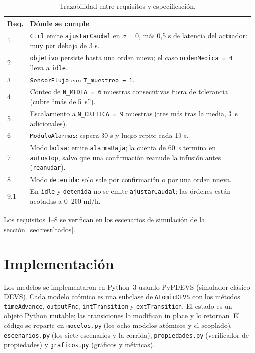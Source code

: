 \documentclass[11pt,a4paper]{article}
\begin{document}
\begin{table}[h]
\centering
\small
\renewcommand{\arraystretch}{1.15}
\begin{tabular}{>{\raggedright}p{1.2cm} p{12.5cm}}
\toprule
Req. & Dónde se cumple \\
\midrule
1 & \texttt{Ctrl} emite \texttt{ajustarCaudal} en $\sigma = 0$, más 0,5 s de latencia del actuador: muy por debajo de 3 s. \\
2 & \texttt{objetivo} persiste hasta una orden nueva; el caso \texttt{ordenMedica = 0} lleva a \texttt{idle}. \\
3 & \texttt{SensorFlujo} con \texttt{T\_muestreo = 1}. \\
4 & Conteo de \texttt{N\_MEDIA = 6} muestras consecutivas fuera de tolerancia (cubre ``más de 5~s''). \\
5 & Escalamiento a \texttt{N\_CRITICA = 9} muestras (tres más tras la media, 3~s adicionales). \\
6 & \texttt{ModuloAlarmas}: espera 30 s y luego repite cada 10 s. \\
7 & Modo \texttt{bolsa}: emite \texttt{alarmaBaja}; la cuenta de 60~s termina en \texttt{autostop}, salvo que una confirmación reanude la infusión antes (\texttt{reanudar}). \\
8 & Modo \texttt{detenida}: solo sale por confirmación o por una orden nueva. \\
9.1 & En \texttt{idle} y \texttt{detenida} no se emite \texttt{ajustarCaudal}; las órdenes están acotadas a 0--200 ml/h. \\
\bottomrule
\end{tabular}
\caption{Trazabilidad entre requisitos y especificación.}
\end{table}

Los requisitos 1--8 se verifican en los escenarios de simulación de la sección~\ref{sec:resultados}.

\section{Implementación}

Los modelos se implementaron en Python~3 usando PyPDEVS (simulador clásico DEVS). Cada modelo atómico es una subclase de \texttt{AtomicDEVS} con los métodos \texttt{timeAdvance}, \texttt{outputFnc}, \texttt{intTransition} y \texttt{extTransition}. El estado es un objeto Python mutable; las transiciones lo modifican in place y lo retornan. El código se reparte en \texttt{modelos.py} (los ocho modelos atómicos y el acoplado), \texttt{escenarios.py} (los siete escenarios y la corrida), \texttt{propiedades.py} (verificador de propiedades) y \texttt{graficos.py} (gráficos y métricas).
\end{document}
